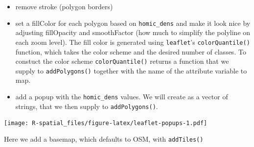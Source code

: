 \documentclass[]{book}
\newenvironment{Shaded}{\begin{snugshade}}{\end{snugshade}}
\newcommand{\KeywordTok}[1]{\textcolor[rgb]{0.13,0.29,0.53}{\textbf{#1}}}
\newcommand{\DataTypeTok}[1]{\textcolor[rgb]{0.13,0.29,0.53}{#1}}
\newcommand{\DecValTok}[1]{\textcolor[rgb]{0.00,0.00,0.81}{#1}}
\newcommand{\FloatTok}[1]{\textcolor[rgb]{0.00,0.00,0.81}{#1}}
\newcommand{\StringTok}[1]{\textcolor[rgb]{0.31,0.60,0.02}{#1}}
\newcommand{\CommentTok}[1]{\textcolor[rgb]{0.56,0.35,0.01}{\textit{#1}}}
\newcommand{\OtherTok}[1]{\textcolor[rgb]{0.56,0.35,0.01}{#1}}
\newcommand{\OperatorTok}[1]{\textcolor[rgb]{0.81,0.36,0.00}{\textbf{#1}}}
\newcommand{\NormalTok}[1]{#1}
\providecommand{\tightlist}{%
  \setlength{\itemsep}{0pt}\setlength{\parskip}{0pt}}
\theoremstyle{definition}
\theoremstyle{definition}
\theoremstyle{definition}
\theoremstyle{remark}
\begin{document}
\begin{itemize}
\tightlist
\item
  remove stroke (polygon borders)\\
\item
  set a fillColor for each polygon based on \texttt{homic\_dens} and
  make it look nice by adjusting fillOpacity and smoothFactor (how much
  to simplify the polyline on each zoom level). The fill color is
  generated using \texttt{leaflet}'s \texttt{colorQuantile()} function,
  which takes the color scheme and the desired number of classes. To
  constuct the color scheme \texttt{colorQuantile()} returns a function
  that we supply to \texttt{addPolygons()} together with the name of the
  attribute variable to map.\\
\item
  add a popup with the \texttt{homic\_dens} values. We will create as a
  vector of strings, that we then supply to \texttt{addPolygons()}.
\end{itemize}

\begin{Shaded}
\end{Shaded}

\texttt{[image: R-spatial\_files/figure-latex/leaflet-popups-1.pdf]}

Here we add a basemap, which defaults to OSM, with \texttt{addTiles()}
\end{document}
